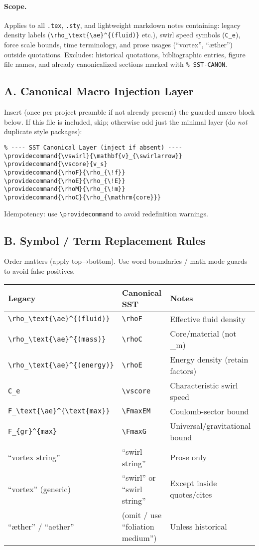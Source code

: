 \documentclass[11pt]{article}
\newcommand{\swirlarrow}{%
	\mathchoice{\mkern-2mu\scriptstyle\boldsymbol{\circlearrowleft}}%
	{\mkern-2mu\scriptstyle\boldsymbol{\circlearrowleft}}%
	{\mkern-2mu\scriptscriptstyle\boldsymbol{\circlearrowleft}}%
	{\mkern-2mu\scriptscriptstyle\boldsymbol{\circlearrowleft}}%
}
\newcommand{\vswirl}{\mathbf{v}_{\swirlarrow}}
\newcommand{\vscore}{v_s}                                %
\newcommand{\rhoF}{\rho_{\!f}}                           %
\newcommand{\rhoE}{\rho_{\!E}}                           %
\newcommand{\rhoM}{\rho_{\!m}}                           %
\newcommand{\rhoC}{\rho_{\mathrm{core}}} %
\newcommand{\FmaxEM}{F_{\mathrm{EM}}^{\max}}             %
\newcommand{\FmaxG}{F_{\mathrm{G}}^{\max}}               %
\begin{document}
\paragraph{Scope.} Applies to all \texttt{.tex}, \texttt{.sty}, and lightweight markdown notes containing: legacy density labels (\verb|\rho_\text{\ae}^{(fluid)}| etc.), swirl speed symbols (\verb|C_e|), force scale bounds, time terminology, and prose usages (``vortex'', ``\ae{}ther'') outside quotations. Excludes: historical quotations, bibliographic entries, figure file names, and already canonicalized sections marked with \verb|% SST-CANON|.

\subsection*{A. Canonical Macro Injection Layer}
Insert (once per project preamble if not already present) the guarded macro block below. If this file is included, skip; otherwise add just the minimal layer (do \emph{not} duplicate style packages):
\begin{verbatim}
% ---- SST Canonical Layer (inject if absent) ----
\providecommand{\vswirl}{\mathbf{v}_{\swirlarrow}}
\providecommand{\vscore}{v_s}
\providecommand{\rhoF}{\rho_{\!f}}
\providecommand{\rhoE}{\rho_{\!E}}
\providecommand{\rhoM}{\rho_{\!m}}
\providecommand{\rhoC}{\rho_{\mathrm{core}}}
\end{verbatim}
Idempotency: use \verb|\providecommand| to avoid redefinition warnings.

\subsection*{B. Symbol / Term Replacement Rules}
Order matters (apply top→bottom). Use word boundaries / math mode guards to avoid false positives.
\begin{center}\small
\begin{tabular}{lll}
\hline
Legacy & Canonical SST & Notes \\
\hline
\verb|\rho_\text{\ae}^{(fluid)}| & \verb|\rhoF| & Effective fluid density \\
\verb|\rho_\text{\ae}^{(mass)}| & \verb|\rhoC| & Core/material (not \rhoM) \\
\verb|\rho_\text{\ae}^{(energy)}| & \verb|\rhoE| & Energy density (retain factors) \\
\verb|C_e| & \verb|\vscore| & Characteristic swirl speed \\
\verb|F_\text{\ae}^{\text{max}}| & \verb|\FmaxEM| & Coulomb-sector bound \\
\verb|F_{gr}^{max}| & \verb|\FmaxG| & Universal/gravitational bound \\
``vortex string'' & ``swirl string'' & Prose only \\
``vortex'' (generic) & ``swirl'' or ``swirl string'' & Except inside quotes/cites \\
``\ae ther'' / ``aether'' & (omit / use ``foliation medium'') & Unless historical \\
\hline
\end{tabular}
\end{center}
\end{document}
